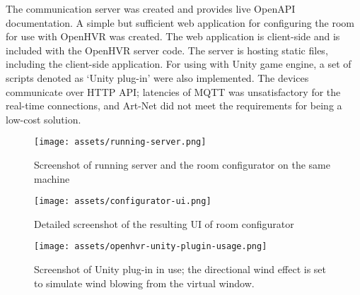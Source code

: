 The communication server was created and provides live OpenAPI documentation.
A simple but sufficient web application for configuring the room for use with
OpenHVR was created. The web application is client-side and is included with
the OpenHVR server code. The server is hosting static files,
including the client-side application.
For using with Unity game engine, a set of scripts denoted as `Unity plug-in'
were also implemented. The devices communicate over HTTP API;
latencies of MQTT was unsatisfactory for the real-time connections, and Art-Net
did not meet the requirements for being a low-cost solution.

\begin{figure}[h]{}
\centering\texttt{[image: assets/running-server.png]}
\caption{Screenshot of running server and the room configurator on the same machine}
\end{figure}

\begin{figure}[h]{}
\centering\texttt{[image: assets/configurator-ui.png]}
\caption{Detailed screenshot of the resulting UI of room configurator}
\end{figure}

\begin{figure}[h]{}
\centering\texttt{[image: assets/openhvr-unity-plugin-usage.png]}
\caption{Screenshot of Unity plug-in in use; the directional wind effect is set to simulate wind blowing from the virtual window.}
\end{figure}
